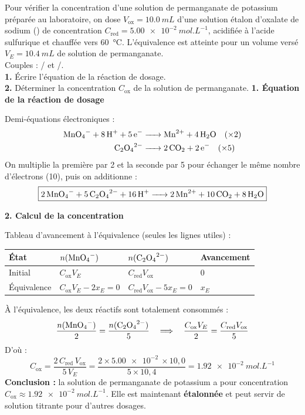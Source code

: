 \documentclass[11pt]{article}
\begin{document}
\begin{exoresolu}
Pour vérifier la concentration d'une solution de permanganate de potassium préparée au laboratoire, on dose $V_{\text{ox}} = \SI{10,0}{mL}$ d'une solution étalon d'oxalate de sodium () de concentration $C_{\text{red}} = \SI{5,00e-2}{mol.L^{-1}}$, acidifiée à l'acide sulfurique et chauffée vers \SI{60}{\celsius}. L'équivalence est atteinte pour un volume versé $V_E = \SI{10,4}{mL}$ de solution de permanganate.\\
Couples : / et /.\\
\textbf{1.} Écrire l'équation de la réaction de dosage.\\
\textbf{2.} Déterminer la concentration $C_{\text{ox}}$ de la solution de permanganate.
\tcblower
\textbf{1. Équation de la réaction de dosage}

Demi-équations électroniques :
\begin{align*}
\ce{MnO4- + 8H+ + 5e-} &\ce{-> Mn^2+ + 4H2O} \quad (\times 2)\\
\ce{C2O4^2-} &\ce{-> 2CO2 + 2e-} \quad (\times 5)
\end{align*}
On multiplie la première par 2 et la seconde par 5 pour échanger le même nombre d'électrons (10), puis on additionne :
\[ \boxed{\ce{2MnO4- + 5C2O4^2- + 16H+ -> 2Mn^2+ + 10CO2 + 8H2O}} \]

\textbf{2. Calcul de la concentration}

Tableau d'avancement à l'équivalence (seules les lignes utiles) :
\begin{center}
\begin{tabularx}{\linewidth}{|l|X|X|X|}
\hline
\rowcolor{popblueL} État & $n(\ce{MnO4-})$ & $n(\ce{C2O4^2-})$ & Avancement \\
\hline
Initial & $C_{\text{ox}}V_E$ & $C_{\text{red}}V_{\text{ox}}$ & $0$ \\
\hline
Équivalence & $C_{\text{ox}}V_E - 2x_E = 0$ & $C_{\text{red}}V_{\text{ox}} - 5x_E = 0$ & $x_E$ \\
\hline
\end{tabularx}
\end{center}
À l'équivalence, les deux réactifs sont totalement consommés :
\[ \frac{n(\ce{MnO4-})}{2} = \frac{n(\ce{C2O4^2-})}{5} \quad\Longrightarrow\quad \frac{C_{\text{ox}}V_E}{2} = \frac{C_{\text{red}}V_{\text{ox}}}{5} \]
D'où :
\[ C_{\text{ox}} = \frac{2\,C_{\text{red}}\,V_{\text{ox}}}{5\,V_E} = \frac{2 \times \SI{5,00e-2}{} \times 10{,}0}{5 \times 10{,}4} = \SI{1,92e-2}{mol.L^{-1}} \]
\textbf{Conclusion :} la solution de permanganate de potassium a pour concentration $C_{\text{ox}} \approx \SI{1,92e-2}{mol.L^{-1}}$. Elle est maintenant \textbf{étalonnée} et peut servir de solution titrante pour d'autres dosages.
\end{exoresolu}
\end{document}

